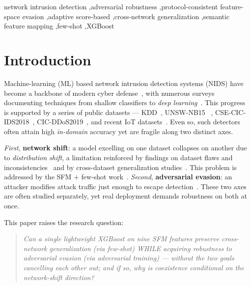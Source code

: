 \documentclass[preprint,12pt,authoryear]{elsarticle}
\begin{document}
\begin{frontmatter}
\begin{keyword}
network intrusion detection \sep adversarial robustness \sep protocol-consistent
feature-space evasion \sep adaptive score-based \sep cross-network generalization
\sep semantic feature mapping \sep few-shot \sep XGBoost
\end{keyword}

\end{frontmatter}

\section{Introduction}
\label{sec:intro}
Machine-learning (ML) based network intrusion detection systems (NIDS) have become
a backbone of modern cyber defense~\citep{cremer,torres,sarker}, with numerous
surveys documenting techniques from shallow classifiers to \emph{deep
learning}~\citep{khraisat,buczak,bhuyan,liulang,mahdavifar}. This progress is
supported by a series of public datasets --- KDD~\citep{kdd}, UNSW-NB15
~\citep{moustafa2015,unsweval}, CSE-CIC-IDS2018~\citep{sharafaldin2018},
CIC-DDoS2019~\citep{cicddos}, and recent IoT datasets~\citep{botiot,toniot,ciciot,ring}.
Even so, such detectors often attain high \emph{in-domain} accuracy yet are fragile
along two distinct axes.

\emph{First}, \textbf{network shift}: a model excelling on one dataset collapses on
another due to \emph{distribution shift}, a limitation reinforced by findings on
dataset flaws and inconsistencies~\citep{engelen,rosay,lanvin,liu,catillo,layeghy}
and by cross-dataset generalization studies~\citep{dhooge,verkerken,cantone}. This
problem is addressed by the SFM $+$ few-shot work~\citep{martono2024sfm}.
\emph{Second}, \textbf{adversarial evasion}: an attacker modifies attack traffic
just enough to escape detection~\citep{biggio2013,goodfellow2015}. These two axes
are often studied separately, yet real deployment demands robustness on both at
once.

This paper raises the research question:
\begin{quote}
\emph{Can a single lightweight XGBoost on nine SFM features preserve cross-network
generalization (via few-shot) WHILE acquiring robustness to adversarial evasion
(via adversarial training) --- without the two goals cancelling each other out; and
if so, why is coexistence conditional on the network-shift direction?}
\end{quote}
\end{document}
